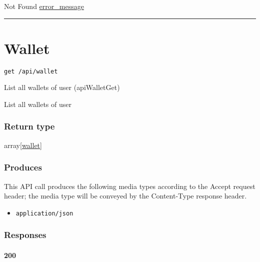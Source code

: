 Not Found \protect\hyperlink{error_message}{error\_message}

\begin{center}\rule{0.5\linewidth}{\linethickness}\end{center}

\hypertarget{wallet-1}{%
\section{\texorpdfstring{\protect\hypertarget{Wallet}{}{Wallet}}{Wallet}}\label{wallet-1}}

\protect\hypertarget{apiWalletGet}{}{}

\begin{verbatim}
get /api/wallet
\end{verbatim}

List all wallets of user ({apiWalletGet})

List all wallets of user

\hypertarget{return-type-144}{%
\subsubsection{Return type}\label{return-type-144}}

array{[}\protect\hyperlink{wallet}{wallet}{]}

\hypertarget{produces-183}{%
\subsubsection{Produces}\label{produces-183}}

This API call produces the following media types according to the
{Accept} request header; the media type will be conveyed by the
{Content-Type} response header.

\begin{itemize}
\tightlist
\item
  \texttt{application/json}
\end{itemize}

\hypertarget{responses-189}{%
\subsubsection{Responses}\label{responses-189}}

\hypertarget{section-609}{%
\paragraph{200}\label{section-609}}


